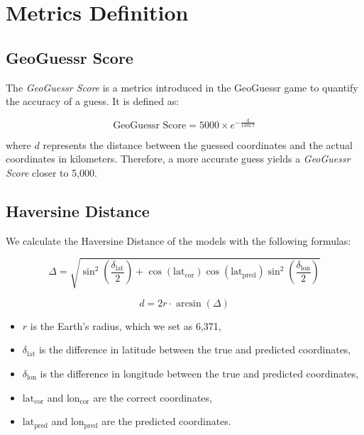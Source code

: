 \section{Metrics Definition}
\label{apd:metrics}

\subsection{GeoGuessr Score}

The \textit{GeoGuessr Score} is a metrics introduced in the GeoGuessr game to quantify the accuracy of a guess. It is defined as:

\begin{equation}
    \text{GeoGuessr Score} = 5000 \times e^{-\frac{\text{d}}{1492.7}}
\end{equation}

where $d$ represents the distance between the guessed coordinates and the actual coordinates in kilometers. Therefore, a more accurate guess yields a \textit{GeoGuessr Score} closer to 5,000.

\subsection{Haversine Distance}
We calculate the Haversine Distance of the models with the following formulas: 

\begin{small}
\begin{equation}
\Delta = \sqrt{\sin^2\left(\frac{\delta_\text{lat}}{2}\right) + \cos(\text{lat}_\text{cor}) \cos(\text{lat}_\text{pred}) \sin^2\left(\frac{\delta_\text{lon}}{2}\right)}
\end{equation}

\begin{equation}
d = 2r \cdot \arcsin(\Delta)
\end{equation}
\end{small}

\begin{itemize}
    \item \( r \) is the Earth’s radius, which we set as 6,371,
    \item \( \delta_\text{lat} \) is the difference in latitude between the true and predicted coordinates,
    \item \( \delta_\text{lon} \) is the difference in longitude between the true and predicted coordinates,
    \item \( \text{lat}_\text{cor} \) and \( \text{lon}_\text{cor} \) are the correct coordinates,
    \item \( \text{lat}_\text{pred} \) and \( \text{lon}_\text{pred} \) are the predicted coordinates.
\end{itemize}


